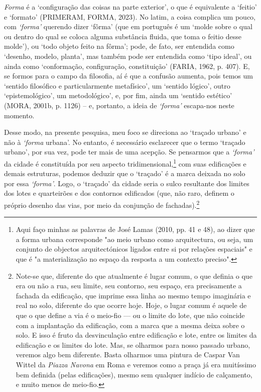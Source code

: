 \documentclass[]{report}
\begin{document}
\textit{Forma} é a `configuração das coisas na parte exterior', o que é equivalente a `feitio' e `formato' (PRIMERAM, FORMA, 2023). No latim, a coisa complica um pouco, com \textit{`forma'} querendo dizer `fôrma' (que em português é um `molde sobre o qual ou dentro do qual se coloca alguma substância fluida, que toma o feitio desse molde'), ou `todo objeto feito na fôrma'; pode, de fato, ser entendida como `desenho, modelo, planta', mas também pode ser entendida como `tipo ideal', ou ainda como `conformação, configuração, constituição' (FARIA, 1962, p. 407). E, se formos para o campo da filosofia, aí é que a confusão aumenta, pois temos um `sentido filosófico e particularmente metafísico', um `sentido lógico', outro `epistemológico', um metodológico', e, por fim, ainda um `sentido estético' (MORA, 2001b, p. 1126) – e, portanto, a ideia de \textit{`forma'} escapa-nos neste momento.

Desse modo, na presente pesquisa, meu foco se direciona ao `traçado urbano' e não à \textit{`forma} urbana'. No entanto, é necessário esclarecer que o termo `traçado urbano', por sua vez, pode ter mais de uma acepção. Se pensarmos que a \textit{`forma'} da cidade é constituída por seu aspecto tridimensional,\footnote[6]{Aqui faço minhas as palavras de José Lamas (2010, pp. 41 e 48), ao dizer que a forma urbana corresponde "ao meio urbano como arquitectura, ou seja, um conjunto de objectos arquitectónicos ligados entre si por relações espaciais" e que é "a materialização no espaço da resposta a um contexto preciso".} com suas edificações e demais estruturas, podemos deduzir que o `traçado' é a marca deixada no solo por essa \textit{`forma'}. Logo, o `traçado' da cidade seria o sulco resultante dos limites dos lotes e quarteirões e dos contornos edificados (que, não raro, definem o próprio desenho das vias, por meio da conjunção de fachadas).\footnote[7]{Note-se que, diferente do que atualmente é lugar comum, o que definia o que era ou não a rua, seu limite, seu contorno, seu espaço, era precisamente a fachada da edificação, que imprime essa linha ao mesmo tempo imaginária e real no solo, diferente do que ocorre hoje. Hoje, o lugar comum é aquele de que o que define a via é o meio-fio — ou o limite do lote, que não coincide com a implantação da edificação, com a marca que a mesma deixa sobre o solo. E isso é fruto da desvinculação entre edificação e lote, entre os limites da edificação e os limites do lote. Mas, se olharmos para nosso passado urbano, veremos algo bem diferente. Basta olharmos uma pintura de Caspar Van Wittel da \textit{Piazza Navona} em Roma e veremos como a praça já era muitíssimo bem definida (pelas edificações), mesmo sem qualquer indício de calçamento, e muito menos de meio-fio.} 
\end{document}
